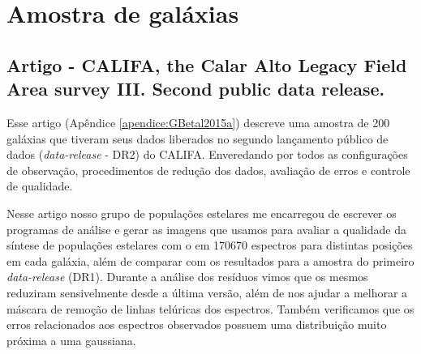 


\chapter{Amostra de galáxias}
\label{sec:amostra}

\section{Artigo - CALIFA, the Calar Alto Legacy Field Area survey III. Second public data
release.}

Esse artigo (Apêndice \ref{apendice:GBetal2015a}) descreve uma amostra de 200 galáxias que tiveram
seus dados liberados no segundo lançamento público de dados ({\em data-release} - DR2) do CALIFA.
Enveredando por todos as configurações de observação, procedimentos de redução dos dados, avaliação
de erros e controle de qualidade. 

Nesse artigo nosso grupo de populações estelares me encarregou de escrever os programas de análise e
gerar as imagens que usamos para avaliar a qualidade da síntese de populações estelares com o
\starlight em 170670 espectros para distintas posições em cada galáxia, além de comparar com os
resultados para a amostra do primeiro {\em data-release} (DR1). Durante a análise dos resíduos vimos
que os mesmos reduziram sensivelmente desde a última versão, além de nos ajudar a melhorar a máscara
de remoção de linhas telúricas dos espectros. Também verificamos que os erros relacionados aos
espectros observados possuem uma distribuição muito próxima a uma gaussiana.

